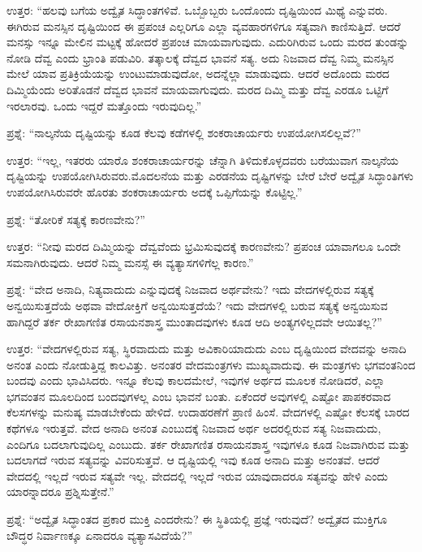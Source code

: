  ಉತ್ತರ: “ಹಲವು ಬಗೆಯ ಅದ್ವೈತ ಸಿದ್ಧಾಂತಗಳಿವೆ. ಒಬ್ಬೊಬ್ಬರು ಒಂದೊಂದು ದೃಷ್ಟಿಯಿಂದ ಮಿಥ್ಯೆ ಎನ್ನುವರು. ಈಗಿರುವ ಮನಸ್ಸಿನ ದೃಷ್ಟಿಯಿಂದ ಈ ಪ್ರಪಂಚ ಎಲ್ಲರಿಗೂ ಎಲ್ಲಾ ವ್ಯವಹಾರಗಳಿಗೂ ಸತ್ಯವಾಗಿ ಕಾಣಿಸುತ್ತಿದೆ. ಆದರೆ ಮನಸ್ಸು ಇನ್ನೂ ಮೇಲಿನ ಮಟ್ಟಕ್ಕೆ ಹೋದರೆ ಪ್ರಪಂಚ ಮಾಯವಾಗುವುದು. ಎದುರಿಗಿರುವ ಒಂದು ಮರದ ತುಂಡನ್ನು ನೋಡಿ ದೆವ್ವ ಎಂದು ಭ್ರಾಂತಿ ಪಡುವಿರಿ. ತತ್ಕಾಲಕ್ಕೆ ದೆವ್ವದ ಭಾವನೆ ಸತ್ಯ. ಅದು ನಿಜವಾದ ದೆವ್ವ ನಿಮ್ಮ ಮನಸ್ಸಿನ ಮೇಲೆ ಯಾವ ಪ್ರತಿಕ್ರಿಯೆಯನ್ನು ಉಂಟುಮಾಡುವುದೋ, ಅದನ್ನೆಲ್ಲಾ ಮಾಡುವುದು. ಆದರೆ ಅದೊಂದು ಮರದ ದಿಮ್ಮಿಯೆಂದು ಅರಿತೊಡನೆ ದೆವ್ವದ ಭಾವನೆ ಮಾಯವಾಗುವುದು. ಮರದ ದಿಮ್ಮಿ ಮತ್ತು ದೆವ್ವ ಎರಡೂ ಒಟ್ಟಿಗೆ ಇರಲಾರವು. ಒಂದು ಇದ್ದರೆ ಮತ್ತೊಂದು ಇರುವುದಿಲ್ಲ.” 

 ಪ್ರಶ್ನೆ: “ನಾಲ್ಕನೆಯ ದೃಷ್ಟಿಯನ್ನು ಕೂಡ ಕೆಲವು ಕಡೆಗಳಲ್ಲಿ ಶಂಕರಾಚಾರ್ಯರು ಉಪಯೋಗಿಸಲಿಲ್ಲವೆ?” 

 ಉತ್ತರ: “ಇಲ್ಲ, ಇತರರು ಯಾರೊ ಶಂಕರಾಚಾರ್ಯರನ್ನು ಚೆನ್ನಾಗಿ ತಿಳಿದುಕೊಳ್ಳದವರು ಬರೆಯುವಾಗ ನಾಲ್ಕನೆಯ ದೃಷ್ಟಿಯನ್ನು ಉಪಯೋಗಿಸಿರುವರು.\break ಮೊದಲನೆಯ ಮತ್ತು ಎರಡನೆಯ ದೃಷ್ಟಿಗಳನ್ನು ಬೇರೆ ಬೇರೆ ಅದ್ವೈತ ಸಿದ್ಧಾಂತಿಗಳು ಉಪಯೋಗಿಸಿರುವರೇ ಹೊರತು ಶಂಕರಾಚಾರ್ಯರು ಅದಕ್ಕೆ ಒಪ್ಪಿಗೆಯನ್ನು ಕೊಟ್ಟಿಲ್ಲ.” 

 ಪ್ರಶ್ನೆ: “ತೋರಿಕೆ ಸತ್ಯಕ್ಕೆ ಕಾರಣವೇನು?” 

 ಉತ್ತರ: “ನೀವು ಮರದ ದಿಮ್ಮಿಯನ್ನು ದೆವ್ವವೆಂದು ಭ್ರಮಿಸುವುದಕ್ಕೆ ಕಾರಣವೇನು? ಪ್ರಪಂಚ ಯಾವಾಗಲೂ ಒಂದೇ ಸಮನಾಗಿರುವುದು. ಆದರೆ ನಿಮ್ಮ ಮನಸ್ಸೆ ಈ ವ್ಯತ್ಯಾಸಗಳಿಗೆಲ್ಲ ಕಾರಣ.” 

 ಪ್ರಶ್ನೆ: “ವೇದ ಅನಾದಿ, ನಿತ್ಯವಾದುದು ಎನ್ನುವುದಕ್ಕೆ ನಿಜವಾದ ಅರ್ಥವೇನು? ಇದು ವೇದಗಳಲ್ಲಿರುವ ಸತ್ಯಕ್ಕೆ ಅನ್ವಯಿಸುತ್ತದೆಯೆ ಅಥವಾ ವೇದೋಕ್ತಿಗೆ ಅನ್ವಯಿಸುತ್ತದೆಯೆ? ಇದು ವೇದಗಳಲ್ಲಿ ಬರುವ ಸತ್ಯಕ್ಕೆ ಅನ್ವಯಿಸುವ ಹಾಗಿದ್ದರೆ ತರ್ಕ ರೇಖಾಗಣಿತ ರಸಾಯನಶಾಸ್ತ್ರ ಮುಂತಾದವುಗಳು ಕೂಡ ಆದಿ ಅಂತ್ಯಗಳಿಲ್ಲದವೇ ಆಯಿತಲ್ಲ?” 

 ಉತ್ತರ: “ವೇದಗಳಲ್ಲಿರುವ ಸತ್ಯ, ಸ್ಥಿರವಾದುದು ಮತ್ತು ಅವಿಕಾರಿಯಾದುದು ಎಂಬ ದೃಷ್ಟಿಯಿಂದ ವೇದವನ್ನು ಅನಾದಿ ಅನಂತ ಎಂದು ನೋಡುತ್ತಿದ್ದ ಕಾಲವಿತ್ತು. ಅನಂತರ ವೇದಮಂತ್ರಗಳು ಮುಖ್ಯವಾದುವು. ಈ ಮಂತ್ರಗಳು ಭಗವಂತನಿಂದ ಬಂದವು ಎಂದು ಭಾವಿಸಿದರು. ಇನ್ನೂ ಕೆಲವು ಕಾಲದಮೇಲೆ, ಇವುಗಳ ಅರ್ಥದ ಮೂಲಕ ನೋಡಿದರೆ, ಎಲ್ಲಾ ಭಗವಂತನ ಮೂಲದಿಂದ ಬಂದವುಗಳಲ್ಲ ಎಂಬ ಭಾವನೆ ಬಂತು. ಏಕೆಂದರೆ ಅವುಗಳಲ್ಲಿ ಎಷ್ಟೋ ಪಾಪಕರವಾದ ಕೆಲಸಗಳನ್ನು ಮನುಷ್ಯ ಮಾಡಬೇಕೆಂದು ಹೇಳಿದೆ. ಉದಾಹರಣೆಗೆ ಪ್ರಾಣಿ ಹಿಂಸೆ. ವೇದಗಳಲ್ಲಿ ಎಷ್ಟೋ ಕೆಲಸಕ್ಕೆ ಬಾರದ ಕಥೆಗಳೂ ಇರುತ್ತವೆ. ವೇದ ಅನಾದಿ ಅನಂತ ಎಂಬುದಕ್ಕೆ ನಿಜವಾದ ಅರ್ಥ ಅದರಲ್ಲಿರುವ ಸತ್ಯ ನಿಜವಾದುದು, ಎಂದಿಗೂ ಬದಲಾಗುವುದಿಲ್ಲ ಎಂಬುದು. ತರ್ಕ ರೇಖಾಗಣಿತ ರಸಾಯನಶಾಸ್ತ್ರ ಇವುಗಳೂ ಕೂಡ ನಿಜವಾಗಿರುವ ಮತ್ತು ಬದಲಾಗದೆ ಇರುವ ಸತ್ಯವನ್ನು ವಿವರಿಸುತ್ತವೆ. ಆ ದೃಷ್ಟಿಯಲ್ಲಿ ಇವು ಕೂಡ ಅನಾದಿ ಮತ್ತು ಅನಂತವೆ. ಆದರೆ ವೇದದಲ್ಲಿ ಇಲ್ಲದೆ ಇರುವ ಸತ್ಯವೇ ಇಲ್ಲ. ವೇದದಲ್ಲಿ ಇಲ್ಲದೆ ಇರುವ ಯಾವುದಾದರೂ ಸತ್ಯವನ್ನು ಹೇಳಿ ಎಂದು ಯಾರನ್ನಾದರೂ ಪ್ರಶ್ನಿಸುತ್ತೇನೆ.” 

\vskip 1pt

 ಪ್ರಶ್ನೆ: “ಅದ್ವೈತ ಸಿದ್ಧಾಂತದ ಪ್ರಕಾರ ಮುಕ್ತಿ ಎಂದರೇನು? ಈ ಸ್ಥಿತಿಯಲ್ಲಿ ಪ್ರಜ್ಞೆ ಇರುವುದೆ? ಅದ್ವೈತದ ಮುಕ್ತಿಗೂ ಬೌದ್ಧರ ನಿರ್ವಾಣಕ್ಕೂ ಏನಾದರೂ ವ್ಯತ್ಯಾಸವಿದೆಯೆ?” 

